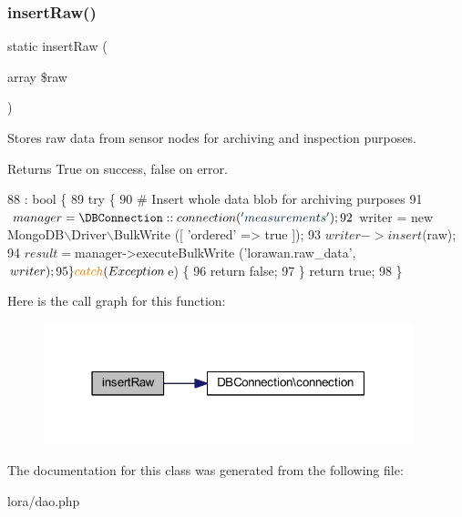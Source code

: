 \subsubsection{insert\+Raw()}
{\footnotesize\ttfamily static insert\+Raw (\begin{DoxyParamCaption}\item[{array}]{\$raw }\end{DoxyParamCaption})\hspace{0.3cm}{\ttfamily [static]}}

Stores raw data from sensor nodes for archiving and inspection purposes. \begin{DoxyReturn}{Returns}
True on success, false on error. 
\end{DoxyReturn}

\begin{DoxyCode}
88                                                   : \textcolor{keywordtype}{bool} \{
89         \textcolor{keywordflow}{try} \{
90 \textcolor{preprocessor}{            # Insert whole data blob for archiving purposes}
91             $manager = \DBConnection::connection (\textcolor{stringliteral}{'measurements'});
92             $writer = \textcolor{keyword}{new} MongoDB\(\backslash\)Driver\(\backslash\)BulkWrite ([ \textcolor{stringliteral}{'ordered'} => \textcolor{keyword}{true} ]);
93             $writer->insert ($raw);
94             $result = $manager->executeBulkWrite (\textcolor{stringliteral}{'lorawan.raw\_data'}, $writer);
95         \} \textcolor{keywordflow}{catch} (Exception $e) \{
96             \textcolor{keywordflow}{return} \textcolor{keyword}{false};
97         \} \textcolor{keywordflow}{return} \textcolor{keyword}{true};
98     \}
\end{DoxyCode}
Here is the call graph for this function\+:
\nopagebreak
\begin{figure}[H]
\begin{center}
\leavevmode
\includegraphics[width=304pt]{class_lora_1_1_d_a_o_aa6d166466386cc6a0147d00719444276_cgraph}
\end{center}
\end{figure}


The documentation for this class was generated from the following file\+:\begin{DoxyCompactItemize}
\item 
lora/dao.\+php\end{DoxyCompactItemize}
